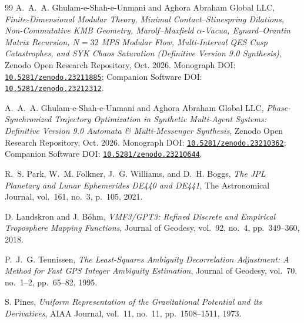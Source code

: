 \documentclass[11pt,a4paper,reqno]{article}
\newcommand{\zenodo}[1]{\href{https://doi.org/10.5281/zenodo.#1}{\nolinkurl{10.5281/zenodo.#1}}}
\theoremstyle{plain}
\theoremstyle{definition}
\theoremstyle{remark}
\numberwithin{equation}{section}
\begin{document}
\begin{thebibliography}{99}
A.~A.~A. Ghulam-e-Shah-e-Unmani and {Aghora Abraham Global LLC},
\emph{Finite-Dimensional Modular Theory, Minimal Contact--Stinespring Dilations, Non-Commutative KMB Geometry, Marolf--Maxfield $\alpha$-Vacua, Eynard--Orantin Matrix Recursion, $N=32$ MPS Modular Flow, Multi-Interval QES Cusp Catastrophes, and SYK Chaos Saturation (Definitive Version 9.0 Synthesis)},
Zenodo Open Research Repository, Oct. 2026.
Monograph DOI: \zenodo{23211885}; Companion Software DOI: \zenodo{23212312}.

A.~A.~A. Ghulam-e-Shah-e-Unmani and {Aghora Abraham Global LLC},
\emph{Phase-Synchronized Trajectory Optimization in Synthetic Multi-Agent Systems: Definitive Version 9.0 Automata \& Multi-Messenger Synthesis},
Zenodo Open Research Repository, Oct. 2026.
Monograph DOI: \zenodo{23210362}; Companion Software DOI: \zenodo{23210644}.

R.~S. Park, W.~M. Folkner, J.~G. Williams, and D.~H. Boggs,
\emph{The JPL Planetary and Lunar Ephemerides DE440 and DE441},
The Astronomical Journal, vol.~161, no.~3, p.~105, 2021.

D. Landskron and J. B\"{o}hm,
\emph{VMF3/GPT3: Refined Discrete and Empirical Troposphere Mapping Functions},
Journal of Geodesy, vol.~92, no.~4, pp.~349--360, 2018.

P.~J.~G. Teunissen,
\emph{The Least-Squares Ambiguity Decorrelation Adjustment: A Method for Fast GPS Integer Ambiguity Estimation},
Journal of Geodesy, vol.~70, no.~1--2, pp.~65--82, 1995.

S. Pines,
\emph{Uniform Representation of the Gravitational Potential and its Derivatives},
AIAA Journal, vol.~11, no.~11, pp.~1508--1511, 1973.

\end{thebibliography}
\end{document}

